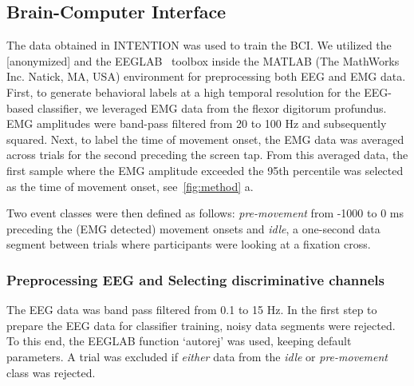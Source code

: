 \subsection{Brain-Computer Interface}\label{BCI}
The data obtained in INTENTION was used to train the BCI. We utilized the [anonymized] and the EEGLAB~\cite{Delorme2004-sn} toolbox inside the MATLAB (The MathWorks Inc. Natick, MA, USA) environment for preprocessing both EEG and EMG data. First, to generate behavioral labels at a high temporal resolution for the EEG-based classifier, we leveraged EMG data from the flexor digitorum profundus. EMG amplitudes were band-pass filtered from 20 to 100 Hz and subsequently squared. Next, to label the time of movement onset, the EMG data was averaged across trials for the second preceding the screen tap. From this averaged data, the first sample where the EMG amplitude exceeded the 95th percentile was selected as the time of movement onset, see~\ref{fig:method} a.


Two event classes were then defined as follows: \textit{pre-movement} from -1000 to 0 ms preceding the (EMG detected) movement onsets and \textit{idle}, a one-second data segment between trials where participants were looking at a fixation cross.

\subsubsection{Preprocessing EEG and Selecting discriminative channels}\label{eeg_methods}
The EEG data was band pass filtered from 0.1 to 15 Hz. In the first step to prepare the EEG data for classifier training, noisy data segments were rejected. To this end, the EEGLAB function `autorej' was used, keeping default parameters. A trial was excluded if \textit{either} data from the \textit{idle} or \textit{pre-movement} class was rejected.

